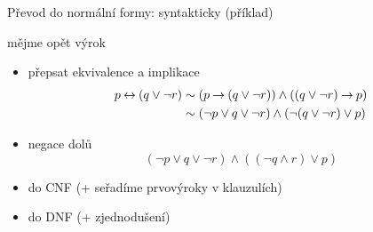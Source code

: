 \documentclass{beamer}
\begin{document}
\begin{frame}{Převod do normální formy: syntakticky (příklad)}


mějme opět výrok 

\begin{itemize}
    \item přepsat ekvivalence a implikace
    \begin{align*}
        p\mathbin{\leftrightarrow} (q\lor \neg r) &\sim (p\mathbin{\rightarrow} (q\lor \neg r)) \land ((q\lor \neg r) \mathbin{\rightarrow} p)\\
        &\sim (\neg p\lor q\lor \neg r) \land (\neg (q\lor \neg r) \lor p)
    \end{align*}
    \item negace dolů
    $$
    (\neg p\lor q\lor \neg r) \land ( (\neg q\land r) \lor p)
    $$
    \item do CNF (+ seřadíme prvovýroky v klauzulích)

    \item do DNF (+ zjednodušení)
\end{itemize}







\end{frame}
\end{document}
